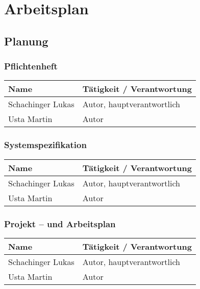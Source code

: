 \pagebreak

\section{Arbeitsplan}
\subsection{Planung}
\subsubsection{Pflichtenheft}
\begin{tabular}{|m{}|m{}|}
\hline
\textbf{Name} & \textbf{Tätigkeit / Verantwortung} \\
\hline
Schachinger Lukas & Autor, hauptverantwortlich \\
\hline
Usta Martin & Autor \\
\hline
\end{tabular}

\subsubsection{Systemspezifikation}
\begin{tabular}{|m{}|m{}|}
\hline
\textbf{Name} & \textbf{Tätigkeit / Verantwortung} \\
\hline
Schachinger Lukas & Autor, hauptverantwortlich \\
\hline
Usta Martin & Autor \\
\hline
\end{tabular}

\subsubsection{Projekt – und Arbeitsplan}
\begin{tabular}{|m{}|m{}|}
\hline
\textbf{Name} & \textbf{Tätigkeit / Verantwortung} \\
\hline
Schachinger Lukas & Autor, hauptverantwortlich \\
\hline
Usta Martin & Autor \\
\hline
\end{tabular}
